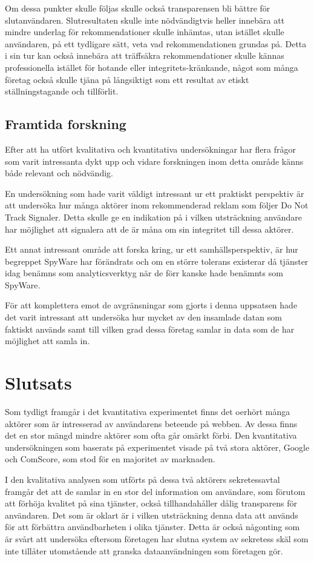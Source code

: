 \documentclass[a4paper,11pt]{article}
\begin{document}
{Om dessa punkter skulle följas skulle också transparensen bli bättre för slutanvändaren. Slutresultaten skulle inte nödvändigtvis heller innebära att mindre underlag för rekommendationer skulle inhämtas, utan istället skulle användaren, på ett tydligare sätt, veta vad rekommendationen grundas på. Detta i sin tur kan också innebära att träffsäkra rekommendationer skulle kännas professionella istället för hotande eller integritets-kränkande, något som många företag också skulle tjäna på långsiktigt som ett resultat av etiskt ställningstagande och tillförlit. 

\subsection{Framtida forskning}
Efter att ha utfört kvalitativa och kvantitativa undersökningar har flera frågor som varit intressanta dykt upp och vidare forskningen inom detta område känns både relevant och nödvändig.

En undersökning som hade varit väldigt intressant ur ett praktiskt perspektiv är att undersöka hur många aktörer inom rekommenderad reklam som följer Do Not Track Signaler. Detta skulle ge en indikation på i vilken utsträckning användare har möjlighet att signalera att de är måna om sin integritet till dessa aktörer.

Ett annat intressant område att forska kring, ur ett samhällsperspektiv, är hur begreppet SpyWare har förändrats och om en större tolerans existerar då tjänster idag benämns som analyticsverktyg när de förr kanske hade benämnts som SpyWare.

För att komplettera emot de avgränsningar som gjorts i denna uppsatsen hade det varit intressant att undersöka hur mycket av den insamlade datan som faktiskt används samt till vilken grad dessa företag samlar in data som de har möjlighet att samla in.

\section{Slutsats}
Som tydligt framgår i det kvantitativa experimentet finns det oerhört många aktörer som är intresserad av användarens beteende på webben. Av dessa finns det en stor mängd mindre aktörer som ofta går omärkt förbi. Den kvantitativa undersökningen som baserats på experimentet visade på två stora aktörer, Google och ComScore, som stod för en majoritet av marknaden.


I den kvalitativa analysen som utförts på dessa två aktörers sekretessavtal framgår det att de samlar in en stor del information om användare, som förutom att förhöja kvalitet på sina tjänster, också tillhandahåller dålig transparens för användaren. Det som är oklart är i vilken utsträckning denna data att används för att förbättra användbarheten i olika tjänster. Detta är också någonting som är svårt att undersöka eftersom företagen har slutna system av sekretess skäl som inte tillåter utomstående att granska dataanvändningen som företagen gör.

}
\end{document}
